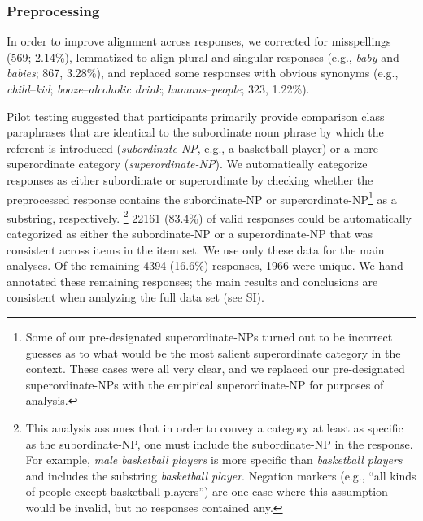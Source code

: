 \documentclass[doc]{apa6}
\newcommand{\red}[1]{\textcolor{Red}{#1}}
\newcommand{\mht}[1]{\textcolor{Blue}{[mht: #1]}}
\begin{document}
\subsubsection{Preprocessing}

In order to improve alignment across responses, we corrected for misspellings (569; 2.14\%), lemmatized to align plural and singular responses (e.g., \emph{baby} and \emph{babies}; 867, 3.28\%), and replaced some responses with obvious synonyms (e.g., \emph{child}--\emph{kid}; \emph{booze}--\emph{alcoholic drink}; \emph{humans}--\emph{people}; 323, 1.22\%). 

Pilot testing suggested that participants primarily provide comparison class paraphrases that are identical to the subordinate noun phrase by which the referent is introduced (\emph{subordinate-NP}, e.g., a basketball player) or a more superordinate category (\emph{superordinate-NP}). 
We automatically categorize responses as either subordinate or superordinate by checking whether the preprocessed response contains the subordinate-NP or superordinate-NP\footnote{Some of our pre-designated superordinate-NPs turned out to be incorrect guesses as to what would be the most salient superordinate category in the context. These cases were all very clear, and we replaced our pre-designated superordinate-NPs with the empirical superordinate-NP for purposes of analysis.} as a substring, respectively. \footnote{This analysis assumes that in order to convey a category at least as specific as the subordinate-NP, one must include the subordinate-NP in the response. 
For example, \emph{male basketball players} is more specific than \emph{basketball players} and includes the substring \emph{basketball player}. Negation markers (e.g., ``all kinds of people except basketball players'') are one case where this assumption would be invalid, but no responses contained any.}
22161 (83.4\%) of valid responses could be automatically categorized as either the subordinate-NP or a superordinate-NP that was consistent across items in the item set. 
We use only these data for the main analyses.
Of the remaining 4394 (16.6\%) responses, 1966 were unique.
We hand-annotated these remaining responses; the main results and conclusions are consistent when analyzing the full data set (see SI).
\end{document}

